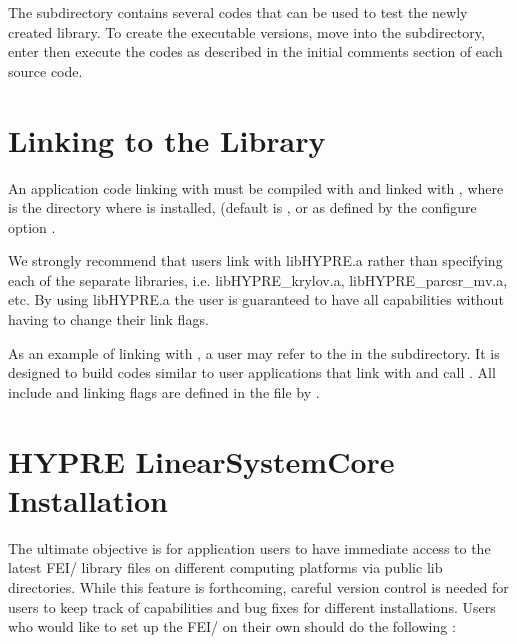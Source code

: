The  subdirectory contains several codes that can be used to test
the newly created \hypre{} library.  To create the executable versions, move into
the  subdirectory, enter  then execute the codes as described
in the initial comments section of each source code.


\section{Linking to the Library}

An application code linking with \hypre{} must be compiled with  
and linked with , where  is the directory 
where \hypre{} is installed, (default is , or as defined by the configure 
option . 

We strongly recommend that users link with libHYPRE.a rather than specifying each 
of the separate \hypre{} libraries, i.e.  libHYPRE\_krylov.a, libHYPRE\_parcsr\_mv.a,
etc.  By using libHYPRE.a the user is guaranteed to have all capabilities without
having to change their link flags.

As an example of linking with \hypre{}, a user may refer to the  in the 
 subdirectory.  It is designed to build codes similar to user applications
that link with and call \hypre{}.  All include and linking flags are defined in the 
 file by .


\section{HYPRE LinearSystemCore Installation}
\label{LSI_install}

The ultimate objective is for application users to have immediate access
to the latest FEI/\hypre{} library files on different computing platforms
via public {\sf lib} directories.  While this feature is forthcoming, careful 
version control is needed for users to keep track of capabilities and bug fixes 
for different installations.  Users who would like to set up the FEI/\hypre{}
on their own should do the following :

